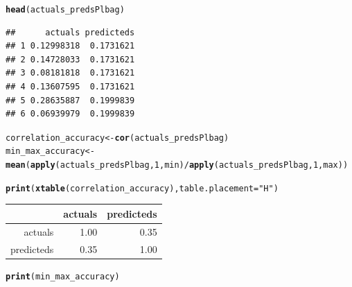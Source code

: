 \documentclass[10pt]{article}\usepackage[]{graphicx}\usepackage[]{color}
\makeatletter
\newcommand{\hlnum}[1]{\textcolor[rgb]{0.686,0.059,0.569}{#1}}%
\newcommand{\hlstr}[1]{\textcolor[rgb]{0.192,0.494,0.8}{#1}}%
\newcommand{\hlopt}[1]{\textcolor[rgb]{0,0,0}{#1}}%
\newcommand{\hlstd}[1]{\textcolor[rgb]{0.345,0.345,0.345}{#1}}%
\newcommand{\hlkwb}[1]{\textcolor[rgb]{0.69,0.353,0.396}{#1}}%
\newcommand{\hlkwc}[1]{\textcolor[rgb]{0.333,0.667,0.333}{#1}}%
\newcommand{\hlkwd}[1]{\textcolor[rgb]{0.737,0.353,0.396}{\textbf{#1}}}%
\newenvironment{kframe}{%
 \def\at@end@of@kframe{}%
 \ifinner\ifhmode%
  \def\at@end@of@kframe{\end{minipage}}%
  \begin{minipage}{\columnwidth}%
 \fi\fi%
 \def\FrameCommand##1{\hskip\@totalleftmargin \hskip-\fboxsep
 \colorbox{shadecolor}{##1}\hskip-\fboxsep
     \hskip-\linewidth \hskip-\@totalleftmargin \hskip\columnwidth}%
 \MakeFramed {\advance\hsize-\width
   \@totalleftmargin\z@ \linewidth\hsize
   \@setminipage}}%
 {\par\unskip\endMakeFramed%
 \at@end@of@kframe}
\newenvironment{knitrout}{}{} %
\makeatother
\begin{document}
\begin{knitrout}
\begin{kframe}
\begin{alltt}
\hlkwd{head}\hlstd{(actuals_predsPlbag)}
\end{alltt}
\begin{verbatim}
##      actuals predicteds
## 1 0.12998318  0.1731621
## 2 0.14728033  0.1731621
## 3 0.08181818  0.1731621
## 4 0.13607595  0.1731621
## 5 0.28635887  0.1999839
## 6 0.06939979  0.1999839
\end{verbatim}
\begin{alltt}
\hlstd{correlation_accuracy} \hlkwb{<-} \hlkwd{cor}\hlstd{(actuals_predsPlbag)}
\hlstd{min_max_accuracy} \hlkwb{<-} \hlkwd{mean}\hlstd{(}\hlkwd{apply}\hlstd{(actuals_predsPlbag,} \hlnum{1}\hlstd{, min)} \hlopt{/} \hlkwd{apply}\hlstd{(actuals_predsPlbag,} \hlnum{1}\hlstd{, max))}
\end{alltt}
\end{kframe}
\end{knitrout}


\begin{kframe}
\begin{alltt}
\hlkwd{print}\hlstd{(}\hlkwd{xtable}\hlstd{(correlation_accuracy),}\hlkwc{table.placement}\hlstd{=}\hlstr{"H"}\hlstd{)}
\end{alltt}
\end{kframe}%
\begin{table}[H]
\centering
\begin{tabular}{rrr}
  \hline
 & actuals & predicteds \\ 
  \hline
actuals & 1.00 & 0.35 \\ 
  predicteds & 0.35 & 1.00 \\ 
   \hline
\end{tabular}
\end{table}
\begin{kframe}\begin{alltt}
\hlkwd{print}\hlstd{(min_max_accuracy)}
\end{alltt}
\end{kframe}[1] 0.6623657
\end{document}
